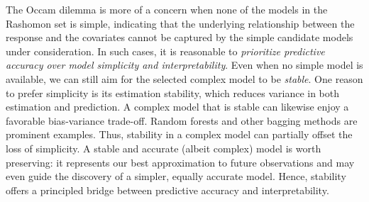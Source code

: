 \documentclass[11pt]{article}
\theoremstyle{plain}
\begin{document}
The Occam dilemma is more of a concern when none of the models in the Rashomon set is simple, indicating that the underlying relationship between the response and the covariates cannot be captured by the simple candidate models under consideration.
In such cases, it is reasonable to \emph{prioritize predictive accuracy over model simplicity and interpretability}.
Even when no simple model is available, we can still aim for the selected complex model to be \emph{stable}. One reason to prefer simplicity is its estimation stability, which reduces variance in both estimation and prediction. A complex model that is stable can likewise enjoy a favorable bias-variance trade-off. Random forests and other bagging methods are prominent examples. Thus, stability in a complex model can partially offset the loss of simplicity. A stable and accurate (albeit complex) model is worth preserving: it represents our best approximation to future observations and may even guide the discovery of a simpler, equally accurate model. Hence, stability offers a principled bridge between predictive
accuracy and interpretability.

  
  
\end{document}
